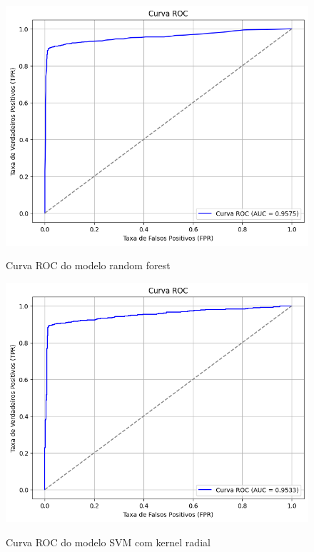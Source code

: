\documentclass[10pt, conference, compsocconf]{IEEEtran}
\begin{document}
\begin{figure}[htbp]
  \centering
  \begin{minipage}{0.2\textwidth} 
    \centering
    \includegraphics[width=\textwidth]{roc_rf.png} 
    \tiny{\caption{Curva ROC do modelo random forest}}
    \label{fig:Curva ROC do modelo random forest}
  \end{minipage}
  \hfill 
  \begin{minipage}{0.2\textwidth}
    \centering
    \includegraphics[width=\textwidth]{roc_radial.png}
    \tiny{\caption{Curva ROC do modelo SVM com kernel radial}}
    \label{fig:Curva ROC do modelo SVM com kernel radial}
  \end{minipage}
  \label{fig:exemplo}
\end{figure}
\end{document}
